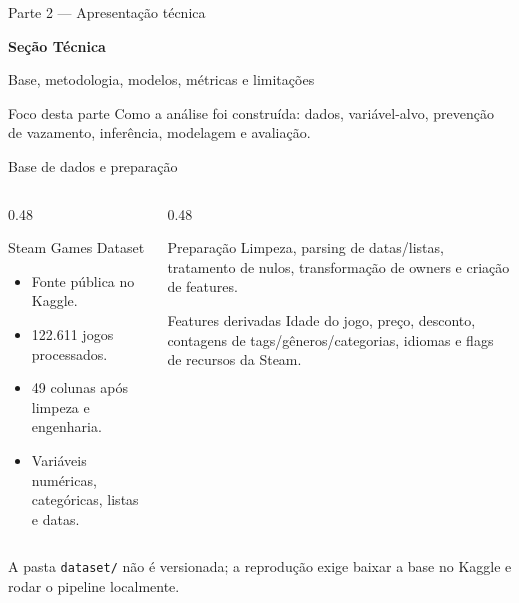 \documentclass[aspectratio=169]{beamer}
\begin{document}
\begin{frame}{Parte 2 --- Apresentação técnica}
\centering
\vspace{0.8cm}

{\Huge\bfseries Seção Técnica}

\vspace{0.35cm}

{\Large Base, metodologia, modelos, métricas e limitações}

\vspace{0.45cm}

\begin{minipage}{0.78\textwidth}
\begin{exampleblock}{Foco desta parte}
\centering
\small
Como a análise foi construída: dados, variável-alvo, prevenção de vazamento, inferência, modelagem e avaliação.
\end{exampleblock}
\end{minipage}

\end{frame}

\begin{frame}{Base de dados e preparação}
\small
\begin{columns}[T,onlytextwidth]
  \begin{column}{0.48\textwidth}
    \begin{block}{Steam Games Dataset}
      \begin{itemize}
        \item Fonte pública no Kaggle.
        \item 122.611 jogos processados.
        \item 49 colunas após limpeza e engenharia.
        \item Variáveis numéricas, categóricas, listas e datas.
      \end{itemize}
    \end{block}
  \end{column}

  \begin{column}{0.48\textwidth}
    \begin{exampleblock}{Preparação}
      Limpeza, parsing de datas/listas, tratamento de nulos, transformação de owners e criação de features.
    \end{exampleblock}

    \vspace{0.08cm}

    \begin{block}{Features derivadas}
      \footnotesize
      Idade do jogo, preço, desconto, contagens de tags/gêneros/categorias, idiomas e flags de recursos da Steam.
    \end{block}
  \end{column}
\end{columns}

\vspace{0.08cm}
\scriptsize
A pasta \texttt{dataset/} não é versionada; a reprodução exige baixar a base no Kaggle e rodar o pipeline localmente.
\end{frame}
\end{document}
